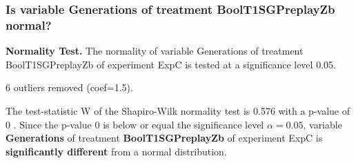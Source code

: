 \begin{frame}[t]
 \frametitle{Is variable Generations of treatment BoolT1SGPreplayZb normal?}
 {\bf Normality Test.} The normality of variable Generations of treatment BoolT1SGPreplayZb of experiment ExpC is tested at a significance level 0.05.

 6 outliers removed (coef=1.5).
 
 The test-statistic W of the Shapiro-Wilk normality test is 0.576 with a p-value of 0 .
 Since the p-value 0 is below or equal the significance level $\alpha= 0.05 $,
 variable {\bf  Generations } of treatment {\bf  BoolT1SGPreplayZb } of experiment ExpC  is {\bf significantly different} from a normal distribution.

 \end{frame}
